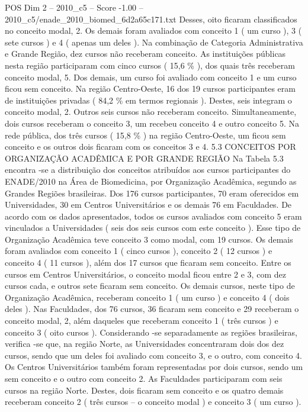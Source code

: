 \begin{textsample}{POS Dim 2 – 2010\_c5 – Score -1.00 – 2010\_c5/enade\_2010\_biomed\_6d2a65c171.txt}
Desses, oito ficaram classificados no conceito modal, 2.
Os demais foram avaliados com conceito 1 ( um curso ), 3 ( sete cursos ) e 4 ( apenas um deles ).
Na combinação de Categoria Administrativa e Grande Região, dez cursos não receberam conceito.
As instituições públicas nesta região participaram com cinco cursos ( 15,6 \% ), dos quais três receberam conceito modal, 5.
Dos demais, um curso foi avaliado com conceito 1 e um curso ficou sem conceito.
Na região Centro-Oeste, 16 dos 19 cursos participantes eram de instituições privadas ( 84,2 \% em termos regionais ).
Destes, seis integram o conceito modal, 2.
Outros seis cursos não receberam conceito.
Simultaneamente, dois cursos receberam o conceito 3, um recebeu conceito 4 e outro conceito 5.
Na rede pública, dos três cursos ( 15,8 \% ) na região Centro-Oeste, um ficou sem conceito e os outros dois ficaram com os conceitos 3 e 4. 5.3 CONCEITOS POR ORGANIZAÇÃO ACADÊMICA E POR GRANDE REGIÃO Na Tabela 5.3 encontra -se a distribuição dos conceitos atribuídos aos cursos participantes do ENADE/2010 na Área de Biomedicina, por Organização Acadêmica, segundo as Grandes Regiões brasileiras.
Dos 176 cursos participantes, 70 eram oferecidos em Universidades, 30 em Centros Universitários e os demais 76 em Faculdades.
De acordo com os dados apresentados, todos os cursos avaliados com conceito 5 eram vinculados a Universidades ( seis dos seis cursos com este conceito ).
Esse tipo de Organização Acadêmica teve conceito 3 como modal, com 19 cursos.
Os demais foram avaliados com conceito 1 ( cinco cursos ), conceito 2 ( 12 cursos ) e conceito 4 ( 11 cursos ), além dos 17 cursos que ficaram sem conceito.
Entre os cursos em Centros Universitários, o conceito modal ficou entre 2 e 3, com dez cursos cada, e outros sete ficaram sem conceito.
Os demais cursos, neste tipo de Organização Acadêmica, receberam conceito 1 ( um curso ) e conceito 4 ( dois deles ).
Nas Faculdades, dos 76 cursos, 36 ficaram sem conceito e 29 receberam o conceito modal, 2, além daqueles que receberam conceito 1 ( três cursos ) e conceito 3 ( oito cursos ).
Considerando -se separadamente as regiões brasileiras, verifica -se que, na região Norte, as Universidades concentraram dois dos dez cursos, sendo que um deles foi avaliado com conceito 3, e o outro, com conceito 4.
Os Centros Universitários também foram representadas por dois cursos, sendo um sem conceito e o outro com conceito 2.
As Faculdades participaram com seis cursos na região Norte.
Destes, dois ficaram sem conceito e os quatro demais receberam conceito 2 ( três cursos – o conceito modal ) e conceito 3 ( um curso ).

\end{textsample}
